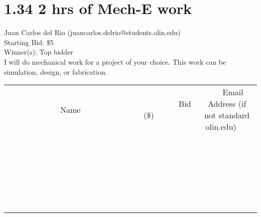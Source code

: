 \documentclass[11pt]{article}
\begin{document}
\section*{1.34 2 hrs of Mech-E work }
Juan Carlos del Rio (juancarlos.delrio@students.olin.edu) \\
Starting Bid: \$5 \\
Winner(s): 
Top bidder \\
I will do mechanical work for a project of your choice. This work can be simulation, design, or fabrication. \\[6ex]
\begin{tabular}{c c c}
~~~~~~~~~~~~~Name~~~~~~~~~~~~~ & ~~~~~~~~~Bid (\$)~~~~~~~~~ & ~~~Email Address (if not standard olin.edu)~~~ \\
 & & \\
\hline
 & & \\
\hline
 & & \\
\hline
 & & \\
\hline
 & & \\
\hline
 & & \\
\hline
 & & \\
\hline
 & & \\
\hline
 & & \\
\hline
 & & \\
\hline
 & & \\
\hline
 & & \\
\hline
 & & \\
\hline
 & & \\
\hline
 & & \\
\hline
 & & \\
\hline
 & & \\
\hline
 & & \\
\hline
 & & \\
\hline
 & & \\
\hline
 & & \\
\hline
 & & \\
\hline
 & & \\
\hline
 & & \\
\hline
 & & \\
\hline
 & & \\
\hline
\end{tabular}
\clearpage
\end{document}
